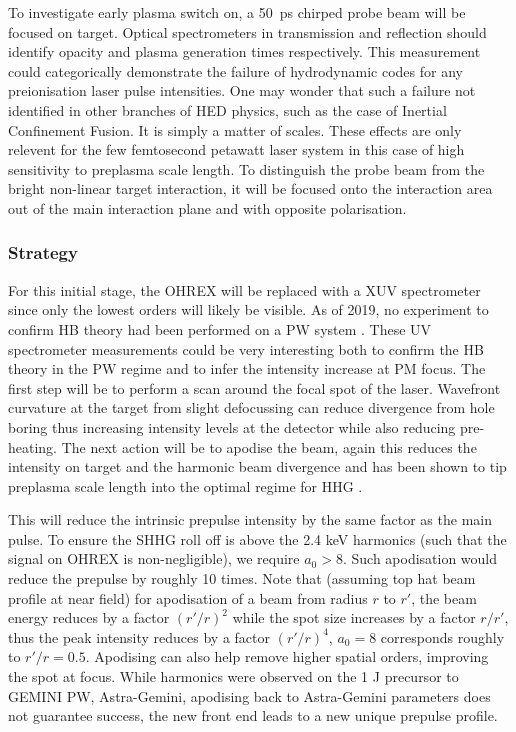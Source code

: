 To investigate early plasma switch on, a \qty{50}{ps} chirped probe beam will be focused on target. Optical spectrometers in transmission and reflection should identify opacity and plasma generation times respectively. This measurement could categorically demonstrate the failure of hydrodynamic codes for any preionisation laser pulse intensities. One may wonder that such a failure not identified in other branches of HED physics, such as the case of Inertial Confinement Fusion. It is simply a matter of scales. These effects are only relevent for the few femtosecond petawatt laser system in this case of high sensitivity to preplasma scale length.
To distinguish the probe beam from the bright non-linear target interaction, it will be focused onto the interaction area out of the main interaction plane and with opposite polarisation.





\subsubsection{Strategy}
For this initial stage, the OHREX will be replaced with a XUV spectrometer since only the lowest orders will likely be visible. As of 2019, no experiment to confirm HB theory had been performed on a PW system \cite{vincentiAchievingExtremeLight2019}. These UV spectrometer measurements could be very interesting both to confirm the HB theory in the PW regime and to infer the intensity increase at PM focus. The first step will be to perform a scan around the focal spot of the laser. Wavefront curvature at the target from slight defocussing can reduce divergence from hole boring thus increasing intensity levels at the detector while also reducing  pre-heating. The next action will be to apodise the beam, again this reduces the intensity on target and the harmonic beam divergence and has been shown to tip preplasma scale length into the optimal regime for HHG \cite{kahalyDirectObservationDensityGradient2013}.

This will reduce the intrinsic prepulse intensity by the same factor as the main pulse. To ensure the SHHG roll off is above the 2.4 keV harmonics (such that the signal on OHREX is non-negligible), we require $a_0 > 8$. Such apodisation would reduce the prepulse by roughly 10 times. Note that (assuming top hat beam profile at near field) for apodisation of a beam from radius $r$ to $r'$, the beam energy reduces by a factor $(r'/r)^2$ while the spot size increases by a factor $r/r'$, thus the peak intensity reduces by a factor $(r'/r)^4$, $a_0 =8$ corresponds roughly to $r'/r = 0.5$. Apodising can also help remove higher spatial orders, improving the spot at focus. While harmonics were observed on the 1 J precursor to GEMINI PW, Astra-Gemini, apodising back to Astra-Gemini parameters does not guarantee success, the new front end leads to a new unique prepulse profile.

